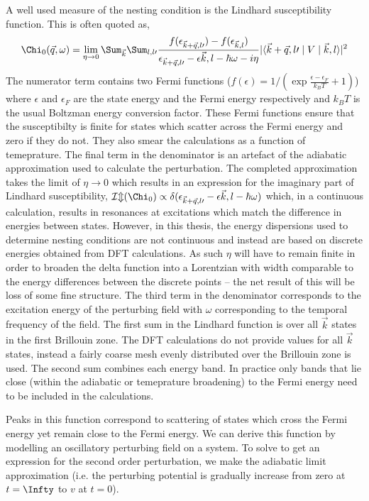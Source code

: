 A well used measure of the nesting condition is the Lindhard susceptibility function. This is often quoted as,
\begin{equation}
\Chi_0(\vec{q}, \omega) = \lim_{\eta \to 0} \Sum_{\vec{k}}\Sum_{l,l\prime}\frac{f(\epsilon_{\vec{k}+\vec{q},l\prime}) - f(\epsilon_{\vec{k},l})}{\epsilon_{\vec{k}+\vec{q},l\prime} - \epsilon{\vec{k},l} - \hbar\omega - i\eta}|\langle \vec{k}+\vec{q},l\prime \mid  V \mid \vec{k},l \rangle|^2
\end{equation}
The numerator term contains two Fermi functions ($f(\epsilon) = 1/(\exp{\frac{\epsilon - \epsilon_F}{k_B T}} + 1)$) where $\epsilon$ and $\epsilon_F$ are the state energy and the Fermi energy respectively and $k_BT$ is the usual Boltzman energy conversion factor. These Fermi functions ensure that the susceptibilty is finite for states which scatter across the Fermi energy and zero if they do not. They also smear the calculations as a function of temeprature. The final term in the denominator is an artefact of the adiabatic approximation used to calculate the perturbation. The completed approximation takes the limit of $\eta \to 0$ which results in an expression for the imaginary part of Lindhard susceptibility, $\mathcal{Im}(\Chi_0) \propto \delta(\epsilon_{\vec{k}+\vec{q},l\prime} - \epsilon{\vec{k},l} - \hbar\omega)$ which, in a continuous calculation, results in resonances at excitations which match the difference in energies between states. However, in this thesis, the energy dispersions used to determine nesting conditions are not continuous and instead are based on discrete energies obtained from DFT calculations. As such $\eta$ will have to remain finite in order to broaden the delta function into a Lorentzian with width comparable to the energy differences between the discrete points -- the net result of this will be loss of some fine structure. The third term in the denominator corresponds to the excitation energy of the perturbing field with $\omega$ corresponding to the temporal frequency of the field. The first sum in the Lindhard function is over all $\vec{k}$ states in the first Brillouin zone. The DFT calculations do not provide values for all $\vec{k}$ states, instead a fairly coarse mesh evenly distributed over the Brillouin zone is used. The second sum combines each energy band. In practice only bands that lie close (within the adiabatic or temeprature broadening) to the Fermi energy need to be included in the calculations.

Peaks in this function correspond to scattering of states which cross the Fermi energy yet remain close to the Fermi energy.  We can derive this function by modelling an oscillatory perturbing field on a system. To solve to get an expression for the second order perturbation, we make the adiabatic limit approximation (i.e. the perturbing potential is gradually increase from zero at $t=\Infty$ to $v$ at $t=0$).

